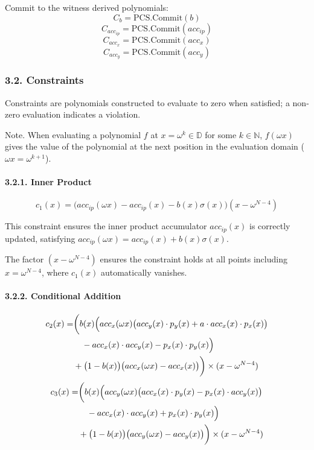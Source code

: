 \documentclass[
]{article}
\begin{document}
Commit to the witness derived polynomials:
\[C_b = \text{PCS.Commit}(b)\]
\[C_{acc_{ip}} = \text{PCS.Commit}(acc_{ip})\]
\[C_{acc_x} = \text{PCS.Commit}(acc_x)\]
\[C_{acc_y} = \text{PCS.Commit}(acc_y)\]

\subsubsection{3.2. Constraints}\label{constraints}

Constraints are polynomials constructed to evaluate to zero when
satisfied; a non-zero evaluation indicates a violation.

Note. When evaluating a polynomial \(f\) at
\(x = \omega^k \in \mathbb{D}\) for some \(k \in \mathbb{N}\),
\(f(\omega x)\) gives the value of the polynomial at the next position
in the evaluation domain (\(\omega x = \omega^{k+1}\)).

\paragraph{3.2.1. Inner Product}\label{inner-product}

\[
c_1(x) = \bigl(acc_{ip}(\omega x) - acc_{ip}(x) - b(x)\sigma(x)\bigr)(x - \omega^{N-4})
\]

This constraint ensures the inner product accumulator \(acc_{ip}(x)\) is
correctly updated, satisfying
\(acc_{ip}(\omega x) = acc_{ip}(x) + b(x)\sigma(x)\).

The factor \((x - \omega^{N-4})\) ensures the constraint holds at all
points including \(x = \omega^{N-4}\), where \(c_1(x)\) automatically
vanishes.

\paragraph{3.2.2. Conditional Addition}\label{conditional-addition}

\[\begin{aligned}
c_2(x) = & \biggl( b(x) \Bigl( acc_x(\omega x)\bigl(acc_y(x) \cdot p_y(x) + a \cdot acc_x(x) \cdot p_x(x)\bigr) \\
         & \quad - acc_x(x) \cdot acc_y(x) - p_x(x) \cdot p_y(x) \Bigr) \\
         & + \bigl(1 - b(x)\bigr) \bigl(acc_x(\omega x) - acc_x(x)\bigr) \biggr) \times (x - \omega^{N-4}) \\
\end{aligned}\] \[\begin{aligned}
c_3(x) = & \biggl( b(x) \Bigl( acc_y(\omega x)\bigl(acc_x(x) \cdot p_y(x) - p_x(x) \cdot acc_y(x)\bigr) \\
         & \quad - acc_x(x) \cdot acc_y(x) + p_x(x) \cdot p_y(x) \Bigr) \\
         & + \bigl(1 - b(x)\bigr) \bigl(acc_y(\omega x) - acc_y(x)\bigr) \biggr) \times (x - \omega^{N-4})
\end{aligned}\]
\end{document}
